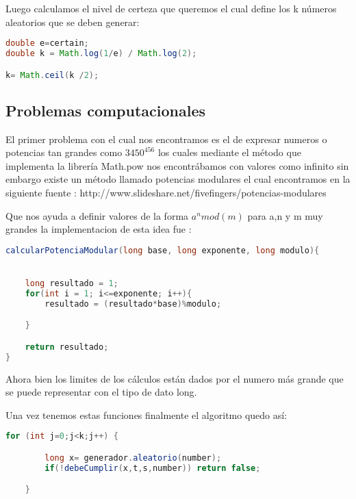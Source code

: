 \documentclass[a4paper,10pt]{article}
\begin{document}
Luego calculamos el nivel de certeza que queremos el cual define los k números aleatorios que se deben generar:
\begin{lstlisting}[language=java]
double e=certain;		
double k = Math.log(1/e) / Math.log(2);

k= Math.ceil(k /2);

\end{lstlisting}



\subsection{Problemas computacionales}

El primer problema con el cual nos encontramos es el de expresar numeros o potencias tan grandes como $3450^{456}$ los cuales mediante el método que implementa la librería Math.pow nos encontrábamos con valores como infinito sin embargo existe un método llamado potencias modulares el cual encontramos en la siguiente fuente : http://www.slideshare.net/fivefingers/potencias-modulares

Que nos ayuda a definir valores de la forma $a^n mod (m)$ para a,n y m muy grandes la implementacion de esta idea fue : 

\begin{lstlisting}[language=java]
 calcularPotenciaModular(long base, long exponente, long modulo){


	long resultado = 1;
	for(int i = 1; i<=exponente; i++){
		resultado = (resultado*base)%modulo;

	} 

	return resultado;
}

\end{lstlisting}


Ahora bien los limites de los cálculos están dados por el numero más grande que se puede representar con el tipo de dato  long.



Una vez tenemos estas funciones finalmente el algoritmo quedo así:
\begin{lstlisting}[language=java]
	for (int j=0;j<k;j++) {

		long x= generador.aleatorio(number);
		if(!debeCumplir(x,t,s,number)) return false;

	}

\end{lstlisting}
\end{document}
